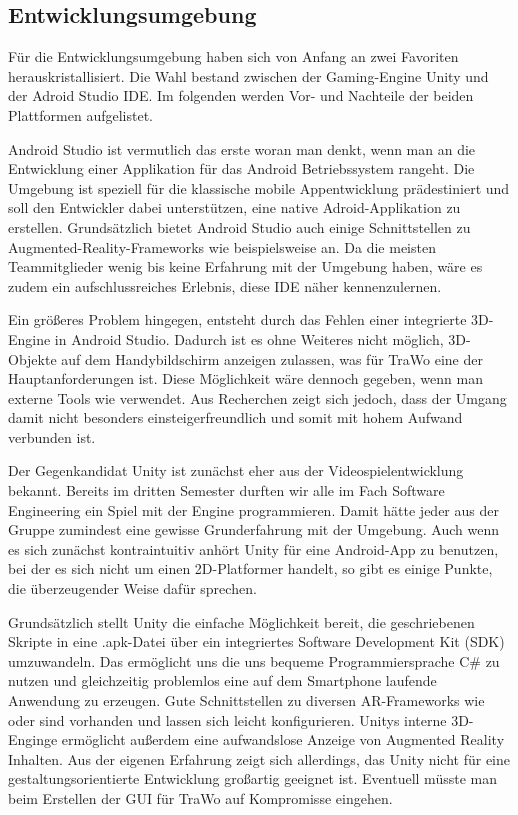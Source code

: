 \subsection{Entwicklungsumgebung}\label{entwicklungsumgebung}
Für die Entwicklungsumgebung haben sich von Anfang an zwei Favoriten herauskristallisiert. Die Wahl bestand zwischen der Gaming-Engine Unity und der Adroid Studio IDE. Im folgenden werden Vor- und Nachteile der beiden Plattformen aufgelistet.

Android Studio ist vermutlich das erste woran man denkt, wenn man an die Entwicklung einer Applikation für das Android Betriebssystem rangeht. Die Umgebung ist speziell für die klassische mobile Appentwicklung prädestiniert und soll den Entwickler dabei unterstützen, eine native Adroid-Applikation zu erstellen. Grundsätzlich bietet Android Studio auch einige Schnittstellen zu Augmented-Reality-Frameworks wie beispielsweise  an. Da die meisten Teammitglieder wenig bis keine Erfahrung mit der Umgebung haben, wäre es zudem ein aufschlussreiches Erlebnis, diese IDE näher kennenzulernen.

Ein größeres Problem hingegen, entsteht durch das Fehlen einer integrierte 3D-Engine in Android Studio. Dadurch ist es ohne Weiteres nicht möglich, 3D-Objekte auf dem Handybildschirm anzeigen zulassen, was für TraWo eine der Hauptanforderungen ist. Diese Möglichkeit wäre dennoch gegeben, wenn man externe Tools wie  verwendet. Aus Recherchen zeigt sich jedoch, dass der Umgang damit nicht besonders einsteigerfreundlich und somit mit hohem Aufwand verbunden ist.

Der Gegenkandidat Unity ist zunächst eher aus der Videospielentwicklung bekannt. Bereits im dritten Semester durften wir alle im Fach Software Engineering ein Spiel mit der Engine programmieren. Damit hätte jeder aus der Gruppe zumindest eine gewisse Grunderfahrung mit der Umgebung. Auch wenn es sich zunächst kontraintuitiv anhört Unity für eine Android-App zu benutzen, bei der es sich nicht um einen 2D-Platformer handelt, so gibt es einige Punkte, die überzeugender Weise dafür sprechen.

Grundsätzlich stellt Unity die einfache Möglichkeit bereit, die geschriebenen Skripte in eine .apk-Datei über ein integriertes Software Development Kit (SDK) umzuwandeln. Das ermöglicht uns die uns bequeme Programmiersprache C\# zu nutzen und gleichzeitig problemlos eine auf dem Smartphone laufende Anwendung zu erzeugen. Gute Schnittstellen zu diversen AR-Frameworks wie  oder  sind vorhanden und lassen sich leicht konfigurieren. Unitys interne 3D-Enginge ermöglicht außerdem eine aufwandslose Anzeige von Augmented Reality Inhalten. Aus der eigenen Erfahrung zeigt sich allerdings, das Unity nicht für eine gestaltungsorientierte Entwicklung großartig geeignet ist. Eventuell müsste man beim Erstellen der GUI für TraWo auf Kompromisse eingehen.

